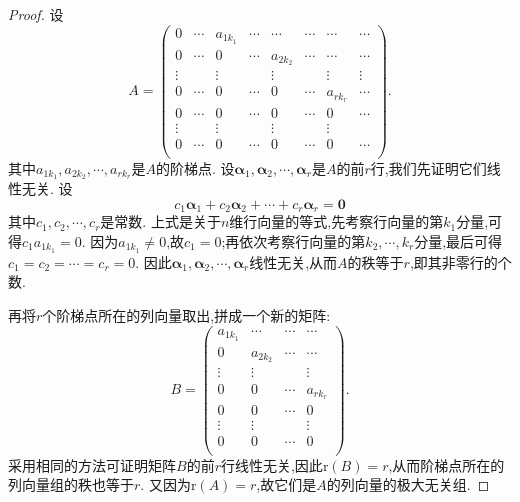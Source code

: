 \documentclass[lang=cn,newtx,10pt,scheme=chinese]{elegantbook}
\begin{document}
\begin{proof}
设
\[
A=\left( \begin{matrix}
0&		\cdots&		a_{1k_1}&		\cdots&		\cdots&		\cdots&		\cdots&		\cdots\\
0&		\cdots&		0&		\cdots&		a_{2k_2}&		\cdots&		\cdots&		\cdots\\
\vdots&		&		\vdots&		&		\vdots&		&		\vdots&		\vdots\\
0&		\cdots&		0&		\cdots&		0&		\cdots&		a_{rk_r}&		\cdots\\
0&		\cdots&		0&		\cdots&		0&		\cdots&		0&		\cdots\\
\vdots&		&		\vdots&		&		\vdots&		&		\vdots&		\\
0&		\cdots&		0&		\cdots&		0&		\cdots&		0&		\cdots\\
\end{matrix} \right) .
\]
其中\(a_{1k_1},a_{2k_2},\cdots,a_{rk_r}\)是\(A\)的阶梯点. 设\(\boldsymbol{\alpha}_1,\boldsymbol{\alpha}_2,\cdots,\boldsymbol{\alpha}_r\)是\(A\)的前\(r\)行,我们先证明它们线性无关. 设
\[
c_1\boldsymbol{\alpha}_1 + c_2\boldsymbol{\alpha}_2+\cdots + c_r\boldsymbol{\alpha}_r=\boldsymbol{0}
\]
其中\(c_1,c_2,\cdots,c_r\)是常数. 上式是关于\(n\)维行向量的等式,先考察行向量的第\(k_1\)分量,可得\(c_1a_{1k_1}=0\). 因为\(a_{1k_1}\neq0\),故\(c_1 = 0\);再依次考察行向量的第\(k_2,\cdots,k_r\)分量,最后可得\(c_1 = c_2=\cdots = c_r = 0\). 因此\(\boldsymbol{\alpha}_1,\boldsymbol{\alpha}_2,\cdots,\boldsymbol{\alpha}_r\)线性无关,从而\(A\)的秩等于\(r\),即其非零行的个数.

再将\(r\)个阶梯点所在的列向量取出,拼成一个新的矩阵:
\[
B=\left( \begin{matrix}
a_{1k_1}&		\cdots&		\cdots&		\cdots\\
0&		a_{2k_2}&		\cdots&		\cdots\\
\vdots&		\vdots&		&		\vdots\\
0&		0&		\cdots&		a_{rk_r}\\
0&		0&		\cdots&		0\\
\vdots&		\vdots&		&		\vdots\\
0&		0&		\cdots&		0\\
\end{matrix} \right) .
\]
采用相同的方法可证明矩阵\(B\)的前\(r\)行线性无关,因此\(\text{r}(B)=r\),从而阶梯点所在的列向量组的秩也等于\(r\). 又因为\(\text{r}(A)=r\),故它们是\(A\)的列向量的极大无关组.
\end{proof}
\end{document}
